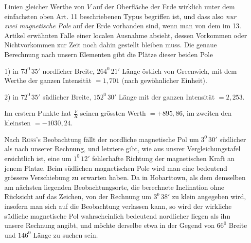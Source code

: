 \par\clearpage
{}
\noindent Linien gleicher Werthe von $V$ auf der Oberfläche der Erde wirklich unter dem einfachsten oben Art. 11 beschriebenen Typus begriffen ist, und dass also \textit{nur zwei magnetische Pole} auf der Erde vorhanden sind, wenn man von dem im 13. Artikel erwähnten Falle einer localen Ausnahme absieht, dessen Vorkommen oder Nichtvorkommen zur Zeit noch dahin gestellt bleiben muss. Die genaue Berechnung nach unsern Elementen gibt die Plätze dieser beiden Pole

1) in $73^0\,35'$ nordlicher Breite, $264^0\,21'$ Länge östlich von Greenwich, mit dem Werthe der ganzen Intensität $=1{,}701$ (nach gewöhnlicher Einheit).

2) in $72^0\,35'$ südlicher Breite, $152^0\,30'$ Länge mit der ganzen Intensität $=2{,}253$.

Im erstern Punkte hat $\frac VR$ seinen grössten Werth $=+895{,}86$, im zweiten den kleinsten $=-1030{,}24$.

Nach \textsc{Ross}’s Beobachtung fällt der nordliche magnetische Pol um $3^0\,30'$ südlicher als nach unserer Rechnung, und letztere gibt, wie aus unsrer Vergleichungstafel ersichtlich ist, eine um $1^0\,12'$ fehlerhafte Richtung der magnetischen Kraft an jenem Platze. Beim südlichen magnetischen Pole wird man eine bedeutend grössere Verschiebung zu erwarten haben. Da in Hobarttown, als dem demselben am nächsten liegenden Beobachtungsorte, die berechnete Inclination ohne Rücksicht auf das Zeichen, von der Rechnung um $3^0\,38'$ zu klein angegeben wird, insofern man sich auf die Beobachtung verlassen kann, so wird der wirkliche südliche magnetische Pol wahrscheinlich bedeutend nordlicher liegen als ihn unsere Rechnung angibt, und möchte derselbe etwa in der Gegend von $66^0$ Breite und $146^0$ Länge zu suchen sein.

